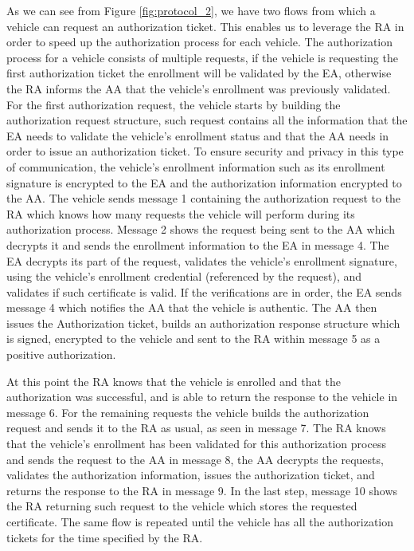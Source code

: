 As we can see from Figure \ref{fig:protocol_2}, we have two flows from which a vehicle can request an authorization ticket. This enables us to leverage the RA in order to speed up the authorization process for each vehicle. The authorization process for a vehicle consists of multiple requests, if the vehicle is requesting the first authorization ticket the enrollment will be validated by the EA, otherwise the RA informs the AA that the vehicle's enrollment was previously validated. For the first authorization request, the vehicle starts by building the authorization request structure, such request contains all the information that the EA needs to validate the vehicle's enrollment status and that the AA needs in order to issue an authorization ticket. To ensure security and privacy in this type of communication, the vehicle's enrollment information such as its enrollment signature is encrypted to the EA and the authorization information encrypted to the AA. The vehicle sends message 1 containing the authorization request to the RA which knows how many requests the vehicle will perform during its authorization process. Message 2 shows the request being sent to the AA which decrypts it and sends the enrollment information to the EA in message 4. The EA decrypts its part of the request, validates the vehicle's enrollment signature, using the vehicle's enrollment credential (referenced by the request), and validates if such certificate is valid. If the verifications are in order, the EA sends message 4 which notifies the AA that the vehicle is authentic. The AA then issues the Authorization ticket, builds an authorization response structure which is signed, encrypted to the vehicle and sent to the RA within message 5 as a positive authorization.

At this point the RA knows that the vehicle is enrolled and that the authorization was successful, and is able to return the response to the vehicle in message 6. For the remaining requests the vehicle builds the authorization request and sends it to the RA as usual, as seen in message 7. The RA knows that the vehicle's enrollment has been validated for this authorization process and sends the request to the AA in message 8, the AA decrypts the requests, validates the authorization information, issues the authorization ticket, and returns the response to the RA in message 9. In the last step, message 10 shows the RA returning such request to the vehicle which stores the requested certificate. The same flow is repeated until the vehicle has all the authorization tickets for the time specified by the RA. 

